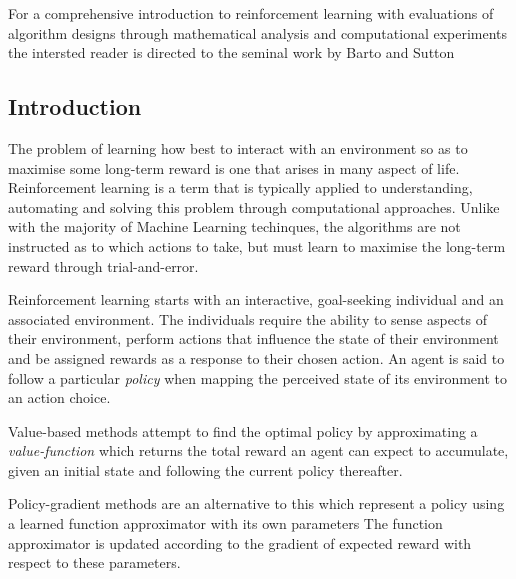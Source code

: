 For a comprehensive introduction to reinforcement learning with evaluations of
algorithm designs through mathematical analysis and computational experiments
the intersted reader is directed to the seminal work by Barto and Sutton

\subsection{Introduction}
The problem of learning how best to interact with an environment so as to
maximise some long-term reward is one that arises in many aspect of life.
Reinforcement learning is a term that is typically applied to
understanding, automating and solving this problem through computational
approaches. Unlike with the majority of Machine Learning techinques, the
algorithms are not instructed as to which actions to take, but must learn to
maximise the long-term reward through trial-and-error.

Reinforcement learning starts with an interactive, goal-seeking individual and
an associated environment.  The individuals require the ability to sense
aspects of their environment, perform actions that influence the state of their
environment and be assigned rewards as a response to their chosen action.  An
agent is said to follow a particular \textit{policy} when mapping the
perceived state of its environment to an action choice.

Value-based methods attempt to find the optimal policy by
approximating a \textit{value-function} which returns the total reward an
agent can expect to accumulate, given an initial state and following the
current policy thereafter.

Policy-gradient methods are an alternative to this which
represent a policy using a learned function approximator with its own
parameters %
The function approximator is updated according to the gradient of expected
reward with respect to these parameters.


